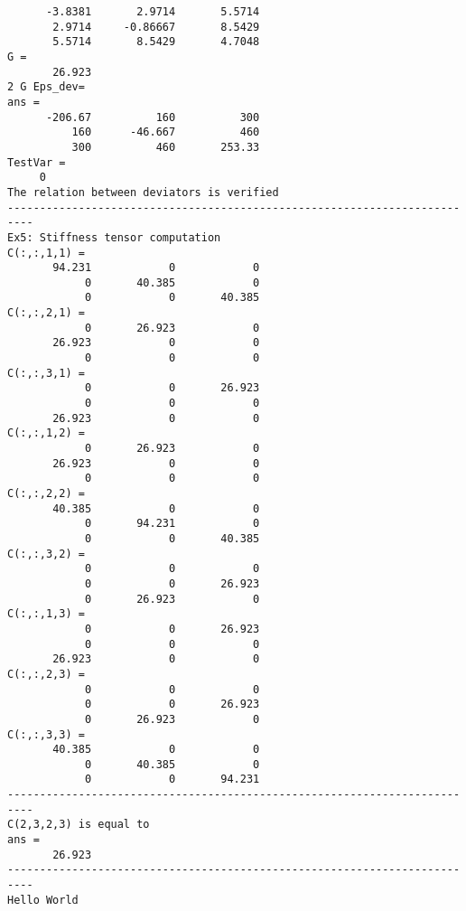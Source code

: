 \documentclass[a4paper,11pt]{article}
\begin{document}
\begin{verbatim}
      -3.8381       2.9714       5.5714
       2.9714     -0.86667       8.5429
       5.5714       8.5429       4.7048
G =
       26.923
2 G Eps_dev=
ans =
      -206.67          160          300
          160      -46.667          460
          300          460       253.33
TestVar =
     0
The relation between deviators is verified
--------------------------------------------------------------------------
Ex5: Stiffness tensor computation
C(:,:,1,1) =
       94.231            0            0
            0       40.385            0
            0            0       40.385
C(:,:,2,1) =
            0       26.923            0
       26.923            0            0
            0            0            0
C(:,:,3,1) =
            0            0       26.923
            0            0            0
       26.923            0            0
C(:,:,1,2) =
            0       26.923            0
       26.923            0            0
            0            0            0
C(:,:,2,2) =
       40.385            0            0
            0       94.231            0
            0            0       40.385
C(:,:,3,2) =
            0            0            0
            0            0       26.923
            0       26.923            0
C(:,:,1,3) =
            0            0       26.923
            0            0            0
       26.923            0            0
C(:,:,2,3) =
            0            0            0
            0            0       26.923
            0       26.923            0
C(:,:,3,3) =
       40.385            0            0
            0       40.385            0
            0            0       94.231
--------------------------------------------------------------------------
C(2,3,2,3) is equal to
ans =
       26.923
--------------------------------------------------------------------------
Hello World

\end{verbatim}

\newpage
\end{document}
